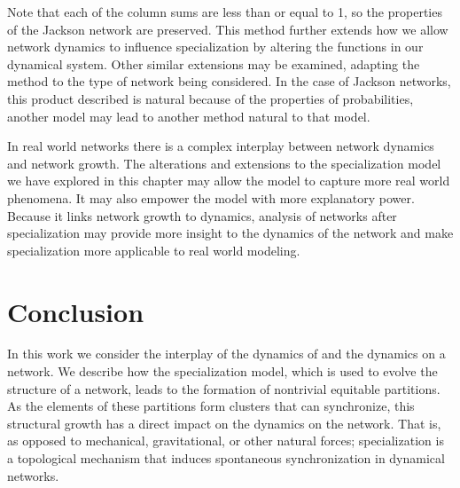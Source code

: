 \documentclass[12pt]{thesis}
\begin{document}
Note that each of the column sums are less than or equal to 1, so the properties of the Jackson network are preserved.
This method further extends how we allow network dynamics to influence specialization by altering the functions in our dynamical system.
Other similar extensions may be examined, adapting the method to the type of network being considered.
In the case of Jackson networks, this product described is natural because of the properties of probabilities, another model may lead to another method natural to that model.

In real world networks there is a complex interplay between network dynamics and network growth.
The alterations and extensions to the specialization model we have explored in this chapter may allow the model to capture more real world phenomena. 
It may also empower the model with more explanatory power.
Because it links network growth to dynamics, analysis of networks after specialization may provide more insight to the dynamics of the network and make specialization more applicable to real world modeling.



\chapter{Conclusion}\label{chapt:conclusion}

In this work we consider the interplay of the {dynamics of} and the {dynamics on} a network. We describe how the specialization model, which is used to evolve the structure of a network, leads to the formation of nontrivial equitable partitions. As the elements of these partitions form clusters that can synchronize, this structural growth has a direct impact on the {dynamics on} the network. That is, as opposed to mechanical, gravitational, or other natural forces;  specialization is a topological mechanism that induces spontaneous synchronization in dynamical networks.   

\end{document}
